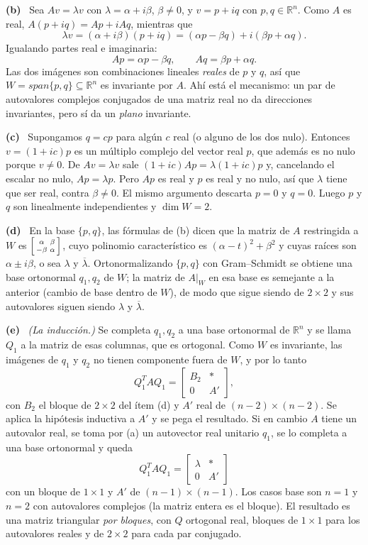 \documentclass[11pt,a4paper]{article}
\newcommand{\bi}[1]{\boldsymbol{#1}}
\newcommand{\n}[1]{\boldsymbol{#1}}
\newcommand{\R}{\mathbb{R}}
\DeclareMathOperator{\gen}{span}
\DeclareMathOperator{\tr}{tr}
\DeclareMathOperator{\rg}{rg}
\def\n#1{#1}\def\bi#1{#1}\def\rg{rg}\def\tr{tr}\def\gen{span}%
\newcommand{\itemsol}[1]{\par\medskip\noindent\textbf{(#1)}\ \ignorespaces}
\begin{document}
\itemsol{b} Sea $A\n v=\lambda\n v$ con $\lambda=\alpha+i\beta$, $\beta\neq0$, y
$\n v=p+iq$ con $p,q\in\R^n$. Como $A$ es real, $A(p+iq)=Ap+iAq$, mientras que
\[
\lambda\n v=(\alpha+i\beta)(p+iq)=(\alpha p-\beta q)+i(\beta p+\alpha q).
\]
Igualando partes real e imaginaria:
\[
Ap=\alpha p-\beta q,\qquad Aq=\beta p+\alpha q .
\]
Las dos imágenes son combinaciones lineales \emph{reales} de $p$ y $q$, así que
$W=\gen\{p,q\}\subseteq\R^n$ es invariante por $A$. Ahí está el mecanismo: un par
de autovalores complejos conjugados de una matriz real no da direcciones
invariantes, pero sí da un \emph{plano} invariante.

\itemsol{c} Supongamos $q=cp$ para algún $c$ real (o alguno de los dos nulo).
Entonces $\n v=(1+ic)p$ es un múltiplo complejo del vector real $p$, que además
es no nulo porque $\n v\neq\n0$. De $A\n v=\lambda\n v$ sale
$(1+ic)Ap=\lambda(1+ic)p$ y, cancelando el escalar no nulo, $Ap=\lambda p$. Pero
$Ap$ es real y $p$ es real y no nulo, así que $\lambda$ tiene que ser real,
contra $\beta\neq0$. El mismo argumento descarta $p=0$ y $q=0$. Luego $p$ y $q$
son linealmente independientes y $\dim W=2$.

\itemsol{d} En la base $\{p,q\}$, las fórmulas de (b) dicen que la matriz de $A$
restringida a $W$ es $\begin{bsmallmatrix}\alpha&\beta\\-\beta&\alpha\end{bsmallmatrix}$,
cuyo polinomio característico es $(\alpha-t)^2+\beta^2$ y cuyas raíces son
$\alpha\pm i\beta$, o sea $\lambda$ y $\overline\lambda$. Ortonormalizando
$\{p,q\}$ con Gram--Schmidt se obtiene una base ortonormal $q_1,q_2$ de $W$; la
matriz de $A|_W$ en esa base es semejante a la anterior (cambio de base dentro de
$W$), de modo que sigue siendo de $2\times2$ y sus autovalores siguen siendo
$\lambda$ y $\overline\lambda$.

\itemsol{e} \emph{(La inducción.)} Se completa $q_1,q_2$ a una base ortonormal de
$\R^n$ y se llama $Q_1$ a la matriz de esas columnas, que es ortogonal. Como $W$
es invariante, las imágenes de $q_1$ y $q_2$ no tienen componente fuera de $W$, y
por lo tanto
\[
Q_1^{T}AQ_1=\begin{bmatrix}B_2&\ast\\ 0&A'\end{bmatrix},
\]
con $B_2$ el bloque de $2\times2$ del ítem (d) y $A'$ real de
$(n-2)\times(n-2)$. Se aplica la hipótesis inductiva a $A'$ y se pega el
resultado. Si en cambio $A$ tiene un autovalor real, se toma por (a) un
autovector real unitario $q_1$, se lo completa a una base ortonormal y queda
\[
Q_1^{T}AQ_1=\begin{bmatrix}\lambda&\ast\\ 0&A'\end{bmatrix}
\]
con un bloque de $1\times1$ y $A'$ de $(n-1)\times(n-1)$. Los casos base son
$n=1$ y $n=2$ con autovalores complejos (la matriz entera es el bloque). El
resultado es una matriz triangular \emph{por bloques}, con $Q$ ortogonal real,
bloques de $1\times1$ para los autovalores reales y de $2\times2$ para cada par
conjugado.
\end{document}
